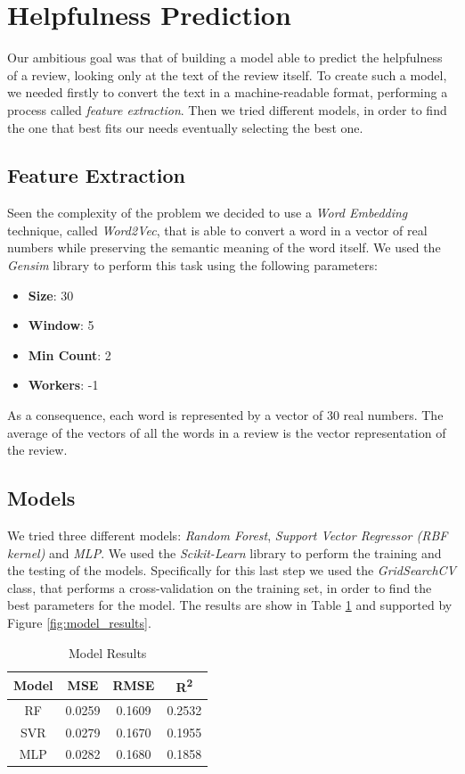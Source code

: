 \section{Helpfulness Prediction}
Our ambitious goal was that of building a model able to predict the helpfulness of a review, looking only at the text of the review itself.
To create such a model, we needed firstly to convert the text in a machine-readable format, performing a process called \textit{feature extraction}.
Then we tried different models, in order to find the one that best fits our needs eventually selecting the best one.

\subsection{Feature Extraction}
Seen the complexity of the problem we decided to use a \textit{Word Embedding} technique, called \textit{Word2Vec}, that is able to convert a word in a vector of real numbers
while preserving the semantic meaning of the word itself. We used the \textit{Gensim} library to perform this task using the following parameters:
\begin{itemize}[noitemsep, leftmargin=*]
    \item \textbf{Size}: 30
    \item \textbf{Window}: 5
    \item \textbf{Min Count}: 2
    \item \textbf{Workers}: -1
\end{itemize}
As a consequence, each word is represented by a vector of 30 real numbers. The average of the vectors of all the words in a review is the vector representation of the review.

\subsection{Models}
We tried three different models: \textit{Random Forest}, \textit{Support Vector Regressor (RBF kernel)} and \textit{MLP}.
We used the \textit{Scikit-Learn} library to perform the training and the testing of the models. Specifically for this last step
we used the \textit{GridSearchCV} class, that performs a cross-validation on the training set, in order to find the best parameters for the model.
The results are show in Table \ref{tab:model_results} and supported by Figure \ref{fig:model_results}.

\begin{table}[H]
    \footnotesize
    \centering
    \caption{Model Results}
    \label{tab:model_results}
    \begin{tabular}{|c|c|c|c|}
        \hline
        Model & MSE & RMSE & R\textsuperscript{2} \\
        \hline
        RF & 0.0259 & 0.1609 & 0.2532 \\
        SVR & 0.0279 & 0.1670 & 0.1955 \\
        MLP & 0.0282 & 0.1680 & 0.1858 \\
        \hline
    \end{tabular}
\end{table}

